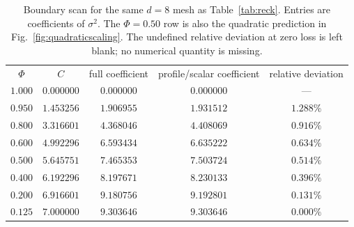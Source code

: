 \begin{table}[!htbp]
\centering
\begin{ruledtabular}
\begin{tabular}{ccccc}
$\Phi$ & $C$ & full coefficient & profile/scalar coefficient & relative deviation\\
\colrule
$1.000$ & $0.000000$ & $0.000000$ & $0.000000$ & ---\\
$0.950$ & $1.453256$ & $1.906955$ & $1.931512$ & $1.288\%$\\
$0.800$ & $3.316601$ & $4.368046$ & $4.408069$ & $0.916\%$\\
$0.600$ & $4.992296$ & $6.593434$ & $6.635222$ & $0.634\%$\\
$0.500$ & $5.645751$ & $7.465353$ & $7.503724$ & $0.514\%$\\
$0.400$ & $6.192296$ & $8.197671$ & $8.230133$ & $0.396\%$\\
$0.200$ & $6.916601$ & $9.180756$ & $9.192801$ & $0.131\%$\\
$0.125$ & $7.000000$ & $9.303646$ & $9.303646$ & $0.000\%$\\
\end{tabular}
\end{ruledtabular}
\caption{Boundary scan for the same $d=8$ mesh as Table~\ref{tab:reck}. Entries are coefficients of $\sigma^2$. The $\Phi=0.50$ row is also the quadratic prediction in Fig.~\ref{fig:quadraticscaling}. The undefined relative deviation at zero loss is left blank; no numerical quantity is missing.}
\label{tab:d8scan}
\end{table}
